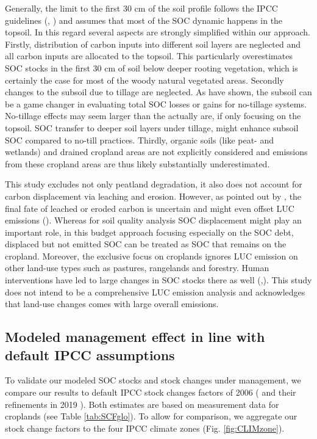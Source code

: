 \documentclass[gc, manuscript]{copernicus}
\begin{document}
Generally, the limit to the first 30 cm of the soil profile follows the IPCC guidelines (\citep{eggleston_ipcc_2006}, \citep{calvo_buendia_ipcc_2019}) and assumes that most of the SOC dynamic happens in the topsoil. In this regard several aspects are strongly simplified within our approach. Firstly, distribution of carbon inputs into different soil layers are neglected and all carbon inputs are allocated to the topsoil. This particularly overestimates SOC stocks in the first 30 cm of soil below deeper rooting vegetation, which is certainly the case for most of the woody natural vegetated areas. Secondly changes to the subsoil due to tillage are neglected. As \citep{powlson_limited_2014} have shown, the subsoil can be a game changer in evaluating total SOC losses or gains for no-tillage systems. No-tillage effects may seem larger than the actually are, if only focusing on the topsoil. SOC transfer to deeper soil layers under tillage, might enhance subsoil SOC compared to no-till practices. Thirdly, organic soils (like peat- and wetlands) and drained cropland areas are not explicitly considered and emissions from these cropland areas are thus likely substantially underestimated.

This study excludes not only peatland degradation, it also does not account for carbon displacement via leaching and erosion. However, as pointed out by \citep{doetterl_erosion_2016}, the final fate of leached or eroded carbon is uncertain and might even offset LUC emissions (\citep{wang_human-induced_2017}). Whereas for soil quality analysis SOC displacement might play an important role, in this budget approach focusing especially on the SOC debt, displaced but not emitted SOC can be treated as SOC that remains on the cropland.
Moreover, the exclusive focus on croplands ignores LUC emission on other land-use types such as pastures, rangelands and forestry. Human interventions have led to large changes in SOC stocks there as well (\citep{sanderman_soil_2017},\citep{friedlingstein_global_2019}). This study does not intend to be a comprehensive LUC emission analysis and acknowledges that land-use changes comes with large overall emissions.

\hypertarget{sec:ipcccompare}{%
\subsection{Modeled management effect in line with default IPCC assumptions}\label{sec:ipcccompare}}

To validate our modeled SOC stocks and stock changes under management, we compare our results to default IPCC stock changes factors of 2006 (\citep{eggleston_ipcc_2006} and their refinements in 2019 \citep{calvo_buendia_ipcc_2019}). Both estimates are based on measurement data for croplands (see Table \ref{tab:SCFglo}). To allow for comparison, we aggregate our stock change factors to the four IPCC climate zones (Fig. \ref{fig:CLIMzone}).
\end{document}
